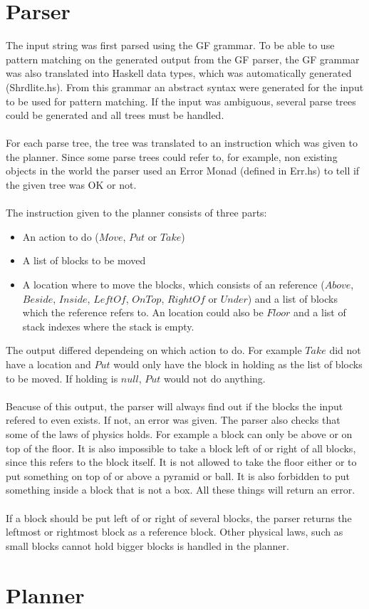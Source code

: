 \section{Parser}
The input string was first parsed using the GF grammar. To be able to use pattern matching on the generated output from the GF parser, the GF grammar was also translated into Haskell data types, which was automatically generated (Shrdlite.hs). From this grammar an abstract syntax were generated for the input to be used for pattern matching. If the input was ambiguous, several parse trees could be generated and all trees must be handled. \\\\
For each parse tree, the tree was translated to an instruction which was given to the planner. Since some parse trees could refer to, for example, non existing objects in the world the parser used an Error Monad (defined in Err.hs) to tell if the given tree was OK or not. \\\\
The instruction given to the planner consists of three parts:
\begin{itemize}
\item An action to do ($Move$, $Put$ or $Take$)
\item A list of blocks to be moved
\item A location where to move the blocks, which consists of an reference ($Above$, $Beside$, $Inside$, $LeftOf$, $OnTop$, $RightOf$ or $Under$) and a list of blocks which the reference refers to. An location could also be $Floor$ and a list of stack indexes where the stack is empty.
\end{itemize}
The output differed dependeing on which action to do. For example $Take$ did not have a location and $Put$ would only have the block in holding as the list of blocks to be moved. If holding is $null$, $Put$ would not do anything.\\\\
Beacuse of this output, the parser will always find out if the blocks the input refered to even exists. If not, an error was given. The parser also checks that some of the laws of physics holds. For example a block can only be above or on top of the floor. It is also impossible to take a block left of or right of all blocks, since this refers to the block itself. It is not allowed to take the floor either or to put something on top of or above a pyramid or ball. It is also forbidden to put something inside a block that is not a box. All these things will return an error. \\\\
If a block should be put left of or right of several blocks, the parser returns the leftmost or rightmost block as a reference block. Other physical laws, such as small blocks cannot hold bigger blocks is handled in the planner.

\section{Planner}


